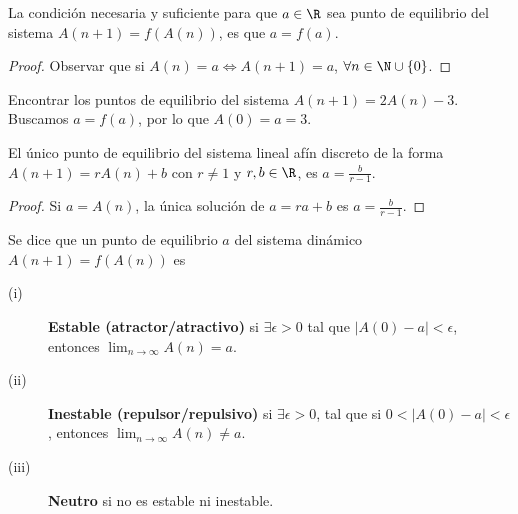\begin{fprop}[]
\normalfont La condición necesaria y suficiente para que $\displaystyle a \in \R $ sea punto de equilibrio del sistema $\displaystyle A\left(n+1\right) = f\left(A\left(n\right)\right) $, es que $\displaystyle a = f\left(a\right) $.
\end{fprop}
\begin{proof}
	Observar que si $\displaystyle A\left(n\right) = a \iff A\left(n+1\right) = a $, $\displaystyle \forall n \in \N \cup \left\{ 0\right\}  $.
\end{proof}
\begin{eg}
\normalfont Encontrar los puntos de equilibrio del sistema $\displaystyle A\left(n+1\right) = 2A\left(n\right)-3 $. Buscamos $\displaystyle a = f\left(a\right) $, por lo que $\displaystyle A\left(0\right) = a = 3 $. 
\end{eg}
\begin{fprop}[]
\normalfont El único punto de equilibrio del sistema lineal afín discreto de la forma $\displaystyle A\left(n+1\right) = rA\left(n\right) + b $ con $\displaystyle r \neq 1 $ y $\displaystyle r,b \in \R $, es $\displaystyle a = \frac{b}{r-1} $.
\end{fprop}
\begin{proof}
Si $\displaystyle a = A\left(n\right) $, la única solución de $\displaystyle a = ra + b $ es $\displaystyle a = \frac{b}{r-1} $.
\end{proof}
\begin{fdefinition}[]
\normalfont Se dice que un punto de equilibrio $\displaystyle a $ del sistema dinámico $\displaystyle A\left(n+1\right) = f\left(A\left(n\right)\right) $ es
\begin{description}
\item[(i)] \textbf{Estable (atractor/atractivo)} si $\displaystyle \exists \epsilon > 0 $ tal que $\displaystyle \left|A\left(0\right)-a\right|<\epsilon  $, entonces $\displaystyle \lim_{n \to \infty}A\left(n\right) = a $.
\item[(ii)] \textbf{Inestable  (repulsor/repulsivo)} si $\displaystyle \exists \epsilon > 0$, tal que si $\displaystyle 0 < \left|A\left(0\right)-a\right|<\epsilon  $, entonces $\displaystyle \lim_{n \to \infty}A\left(n\right) \neq a $.
\item[(iii)] \textbf{Neutro} si no es estable ni inestable.
\end{description}
\end{fdefinition}

